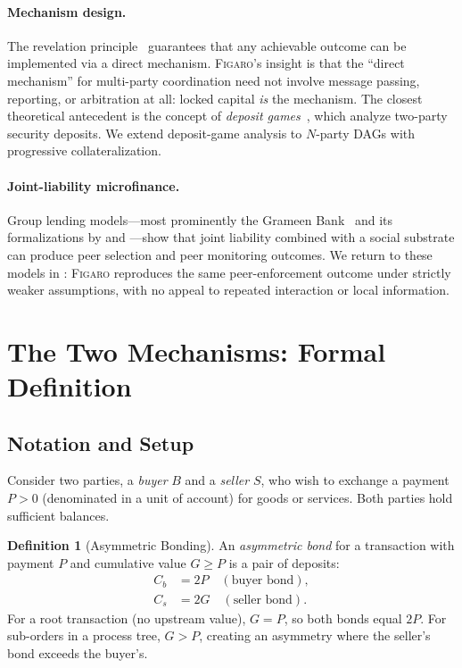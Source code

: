 \documentclass[11pt,a4paper]{article}
\theoremstyle{definition}
\newtheorem{definition}[theorem]{Definition}
\theoremstyle{remark}
\newcommand{\figaro}{\textsc{Figaro}}
\newcommand{\pay}{P}           %
\newcommand{\cumval}{G}        %
\newcommand{\sbond}{C_s}       %
\newcommand{\bbond}{C_b}       %
\begin{document}
\paragraph{Mechanism design.}
The revelation principle~\citep{myerson1979} guarantees that any
achievable outcome can be implemented via a direct mechanism.
\figaro{}'s insight is that the ``direct mechanism'' for multi-party
coordination need not involve message passing, reporting, or
arbitration at all: locked capital \emph{is} the mechanism. The
closest theoretical antecedent is the concept of \emph{deposit
games}~\citep{asgaonkar2019}, which analyze two-party security
deposits. We extend deposit-game analysis to $N$-party DAGs with
progressive collateralization.

\paragraph{Joint-liability microfinance.}
Group lending models---most prominently the Grameen
Bank~\citep{grameen1999} and its formalizations by
\citet{ghatak1999} and \citet{stiglitz1990}---show that joint
liability combined with a social substrate can produce peer
selection and peer monitoring outcomes. We return to these models in
: \figaro{} reproduces the same
peer-enforcement outcome under strictly weaker assumptions, with no
appeal to repeated interaction or local information.

\section{The Two Mechanisms: Formal Definition}
\label{sec:mechanism}

\subsection{Notation and Setup}

Consider two parties, a \emph{buyer} $B$ and a \emph{seller} $S$, who
wish to exchange a payment $\pay > 0$ (denominated in a unit of
account) for goods or services. Both parties hold sufficient balances.

\begin{definition}[Asymmetric Bonding]
\label{def:asymmetric-bonding}
An \emph{asymmetric bond} for a transaction with payment $\pay$ and
cumulative value $\cumval \geq \pay$ is a pair of deposits:
\begin{align}
  \bbond &= 2\pay \quad (\text{buyer bond}), \label{eq:buyer-bond} \\
  \sbond &= 2\cumval \quad (\text{seller bond}). \label{eq:seller-bond}
\end{align}
For a root transaction (no upstream value), $\cumval = \pay$, so both
bonds equal $2\pay$. For sub-orders in a process tree,
$\cumval > \pay$, creating an asymmetry where the seller's bond exceeds
the buyer's.
\end{definition}
\end{document}
